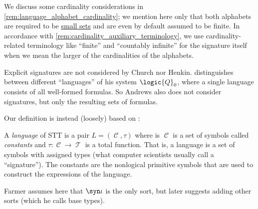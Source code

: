 \begin{comments}
  \item We discuss some cardinality considerations in \cref{rem:language_alphabet_cardinality}; we mention here only that both alphabets are required to be \hyperref[def:small_set]{small sets} and are even by default assumed to be finite. In accordance with \cref{rem:cardinality_auxiliary_terminology}, we use cardinality-related terminology like \enquote{finite} and \enquote{countably infinite} for the signature itself when we mean the larger of the cardinalities of the alphabets.

  \item Explicit signatures are not considered by Church nor Henkin. \Textcite[\S 55]{Andrews2002Logic} distinguishes between different \enquote{languages} of his system \( \logic{Q}_0 \), where a single language consists of all well-formed formulas. So Andrews also does not consider signatures, but only the resulting sets of formulas.

  Our definition is instead (loosely) based on \cite[270]{Farmer2008STTVirtues}:
  \begin{displayquote}
    A \textit{language} of STT is a pair \( L = (\mscrC, \tau) \) where is \( \mscrC \) is a set of symbols called \textit{constants} and \( \tau: \mscrC \to \mscrT \) is a total function. That is, a language is a set of symbols with assigned types (what computer scientists usually call a \enquote{signature}). The constants are the nonlogical primitive symbols that are used to construct the expressions of the language.
  \end{displayquote}

  Farmer assumes here that \( \syn\iota \) is the only sort, but later suggests adding other sorts (which he calls base types).
\end{comments}

